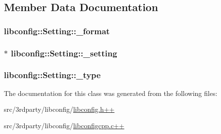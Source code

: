 \subsection{Member Data Documentation}
\hypertarget{classlibconfig_1_1Setting_a0adb3518c70479c207e0806496fb6bf3}{
\subsubsection[{\-\_\-format}]{ libconfig\-::\-Setting\-::\-\_\-format\hspace{0.3cm}{\ttfamily [private]}}}\label{classlibconfig_1_1Setting_a0adb3518c70479c207e0806496fb6bf3}
\hypertarget{classlibconfig_1_1Setting_ace7debd950cda166c1b0d6c482cff0ef}{
\subsubsection[{\-\_\-setting}]{$\ast$ libconfig\-::\-Setting\-::\-\_\-setting\hspace{0.3cm}{\ttfamily [private]}}}\label{classlibconfig_1_1Setting_ace7debd950cda166c1b0d6c482cff0ef}
\hypertarget{classlibconfig_1_1Setting_a0c17fb66c117aed38b4566d3a24e14c5}{
\subsubsection[{\-\_\-type}]{ libconfig\-::\-Setting\-::\-\_\-type\hspace{0.3cm}{\ttfamily [private]}}}\label{classlibconfig_1_1Setting_a0c17fb66c117aed38b4566d3a24e14c5}


The documentation for this class was generated from the following files\-:\begin{DoxyCompactItemize}
\item 
src/3rdparty/libconfig/\hyperlink{libconfig_8h_09_09}{libconfig.\-h++}\item 
src/3rdparty/libconfig/\hyperlink{libconfigcpp_8c_09_09}{libconfigcpp.\-c++}\end{DoxyCompactItemize}
